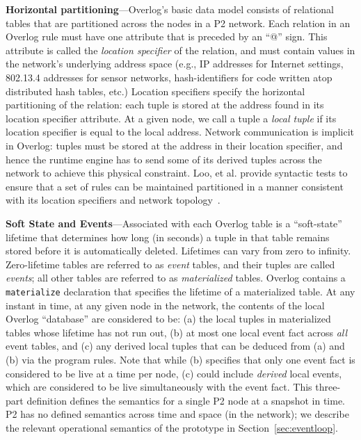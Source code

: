 \documentclass{sigmod08}
\newcommand{\ol}[1]{\texttt{\small #1}\xspace}
\newcommand{\stitle}[1]{\textbf{#1}---}
\begin{document}
\stitle{Horizontal partitioning}Overlog's basic data model consists of
relational tables that are partitioned across the nodes in a P2 network.
Each relation in an Overlog rule must have one attribute that is
preceded by an ``@'' sign.  This attribute is called the {\em location
  specifier} of the relation, and must contain values in the network's
underlying address space (e.g., IP addresses for Internet settings,
802.13.4 addresses for sensor networks, hash-identifiers for code
written atop distributed hash tables, etc.)  Location specifiers specify
the horizontal partitioning of the relation: each tuple is stored at the
address found in its location specifier attribute.  At a given node, we
call a tuple a {\em local tuple} if its location specifier is equal to
the local address.  Network communication is implicit in Overlog: tuples
must be stored at the address in their location specifier, and hence the
runtime engine has to send some of its derived tuples across the network
to achieve this physical constraint.  Loo, et al. provide syntactic tests to
ensure that a set of rules can be maintained partitioned in a manner
consistent with its location specifiers and network
topology~\cite{loo-sigmod06}.


\stitle{Soft State and Events}Associated with each Overlog table is a
``soft-state'' lifetime that determines how long (in seconds) a tuple in
that table remains stored before it is automatically deleted.  Lifetimes
can vary from zero to infinity.  Zero-lifetime tables are referred to as
{\em event} tables, and their tuples are called \emph{events}; all other
tables are referred to as {\em materialized} tables.  Overlog contains a
\ol{materialize} declaration that specifies the lifetime of a
materialized table.  At any instant in time, at any given node in the
network, the contents of the local Overlog ``database'' are considered
to be: (a) the local tuples in materialized tables whose lifetime has
not run out, (b) at most one local event fact across {\em all} event
tables, and (c) any derived local tuples that can be deduced from (a)
and (b) via the program rules.  Note that while (b) specifies that only
one event fact is considered to be live at a time per node, (c) could
include {\em derived} local events, which are considered to be live
simultaneously with the event fact.  This three-part definition defines the semantics for a
single P2 node at a snapshot in time.  P2 has no defined semantics
across time and space (in the network); we describe the relevant operational
semantics of the prototype in Section~\ref{sec:eventloop}.
     
\end{document}
